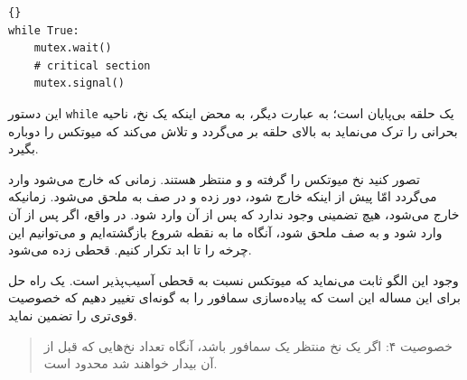 \documentclass{book}
\begin{document}
\begin{latin}
\begin{latin}
\begin{lstlisting}[title=\rl{حلقه میوتکس}]{}
while True:
    mutex.wait()
    # critical section 
    mutex.signal()
\end{lstlisting}
\end{latin}
\end{latin}

    این دستور {\tt while} یک حلقه بی‌پایان است؛ به عبارت دیگر، به محض اینکه یک نخ، ناحیه بحرانی را ترک می‌نماید به بالای حلقه بر می‌گردد و 
    تلاش می‌کند که میوتکس را دوباره بگیرد. 

    تصور کنید نخ  میوتکس را گرفته و  و  منتظر هستند. 
    زمانی که  خارج می‌شود  وارد می‌گردد امّا پیش از اینکه   خارج شود،   دور زده و در صف به   ملحق می‌شود. 
    زمانیکه   خارج می‌شود، هیچ تضمینی وجود ندارد که  پس از آن   وارد شود. در واقع، اگر پس از آن  وارد شود و   
    به صف ملحق شود، آنگاه ما به نقطه  شروع بازگشته‌ایم و می‌توانیم این چرخه را تا ابد تکرار کنیم.  قحطی زده می‌شود. 

    وجود این الگو ثابت می‌نماید که میوتکس نسبت به قحطی آسیب‌پذیر است. 
    یک راه حل برای این مساله این است که پیاده‌سازی سمافور را به گونه‌ای تغییر دهیم که خصوصیت قوی‌تری را تضمین نماید. 

\begin{quote}
    خصوصیت ۴: اگر یک نخ منتظر یک سمافور باشد، آنگاه تعداد نخ‌هایی که قبل از آن بیدار خواهند شد محدود است. 
\end{quote}
\end{document}
